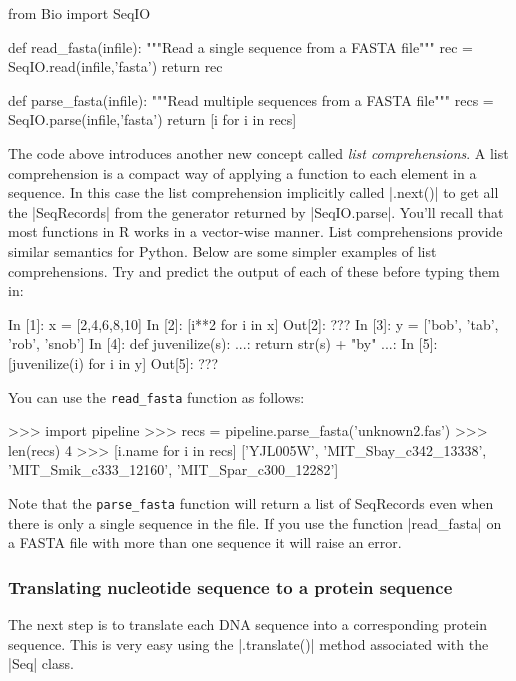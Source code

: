 \documentclass[10pt,letterpaper]{scrartcl}
\begin{document}
\begin{python}
from Bio import SeqIO

def read_fasta(infile):
    """Read a single sequence from a FASTA file"""
    rec = SeqIO.read(infile,'fasta')
    return rec

def parse_fasta(infile):
    """Read multiple sequences from a FASTA file"""
    recs = SeqIO.parse(infile,'fasta')
    return [i for i in recs] 
\end{python}

The code above introduces another new concept called \emph{list comprehensions}. A list comprehension is a compact way of applying a function to each element in a sequence. In this case the list comprehension implicitly called |.next()| to get all the |SeqRecords| from the generator returned by |SeqIO.parse|.  You'll recall that most functions in R works in a vector-wise manner. List comprehensions provide similar semantics for Python.  Below are some simpler examples of list comprehensions. Try and predict the output of each of these before typing them in:

\begin{python}
In [1]: x = [2,4,6,8,10]
In [2]: [i**2 for i in x]
Out[2]: ???
In [3]: y = ['bob', 'tab', 'rob', 'snob']
In [4]: def juvenilize(s):
   ...:     return str(s) + "by"
   ...:
In [5]: [juvenilize(i) for i in y]
Out[5]: ???
\end{python}

You can  use the \verb=read_fasta= function as follows:
\begin{python}
>>> import pipeline
>>> recs = pipeline.parse_fasta('unknown2.fas')
>>> len(recs)
4
>>> [i.name for i in recs]
['YJL005W', 'MIT_Sbay_c342_13338', 'MIT_Smik_c333_12160', 'MIT_Spar_c300_12282']
\end{python}

Note that the \verb=parse_fasta= function will return a list of SeqRecords even when there is only a single sequence in the file. If you use the function |read_fasta| on a FASTA file with more than one sequence it will raise an error.

\subsubsection*{Translating nucleotide sequence to a protein sequence}

The next step is to translate each  DNA sequence into a corresponding protein sequence. This is very easy using the |.translate()| method associated with the |Seq| class.
\end{document}
